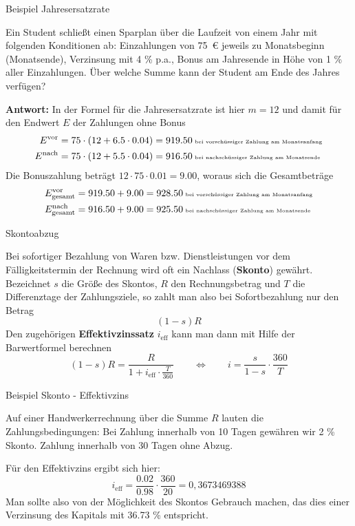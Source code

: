 \begin{frame}{Beispiel Jahresersatzrate}
	\begin{example}
	Ein Student schließt einen Sparplan über die Laufzeit von einem Jahr mit folgenden Konditionen ab: Einzahlungen von 75 € jeweils zu Monatsbeginn (Monatsende), Verzinsung mit 4 \% p.a., Bonus am Jahresende in Höhe von 1 \% aller Einzahlungen. Über welche Summe kann der Student am Ende des Jahres verfügen?
	
	\textbf{Antwort: } In der Formel für die Jahresersatzrate ist hier $m=12$ und damit für den Endwert $E$ der Zahlungen ohne Bonus
	\begin{align*}
		E^{\text{vor}} &  = 75 \cdot \left( 12+6.5 \cdot 0.04 \right) = 919.50 \text{\tiny{ bei vorschüssiger Zahlung am Monatsanfang}} \\
		E^{\text{nach}} &  = 75 \cdot \left( 12+5.5 \cdot 0.04 \right) = 916.50 \text{\tiny{ bei nachschüssiger Zahlung am Monatsende}}
	\end{align*}
	Die Bonuszahlung beträgt $12 \cdot 75 \cdot 0.01 = 9.00$, woraus sich die Gesamtbeträge
		\begin{align*}
		E^{\text{vor}}_{\text{gesamt}} & = 919.50 + 9.00 = 928.50 \text{\tiny{ bei vorschüssiger Zahlung am Monatsanfang}} \\
		E^{\text{nach}}_{\text{gesamt}} & = 916.50 + 9.00 = 925.50 \text{\tiny{ bei nachschüssiger Zahlung am Monatsende}}
		\end{align*}
\end{example}		
\end{frame}

\begin{frame}{Skontoabzug}
	\begin{bemerkung}
		Bei sofortiger Bezahlung von Waren bzw. Dienstleistungen vor dem Fälligkeitstermin der Rechnung wird oft ein Nachlass (\textbf{Skonto}) gewährt. Bezeichnet $s$ die Größe des Skontos, $R$ den Rechnungsbetrag und $T$ die Differenztage der Zahlungsziele, so zahlt man also bei Sofortbezahlung nur den Betrag
		\[
			\left(1-s\right) R
		\] 
		Den zugehörigen \textbf{Effektivzinssatz} $i_{\text{eff}}$ kann man dann mit Hilfe der Barwertformel berechnen
		\[
			\left(1-s\right) R = \frac{R}{1+i_{\text{eff}}\cdot\frac{T}{360}} \qquad \Leftrightarrow \qquad i = \frac{s}{1-s} \cdot \frac{360}{T}
		\]
	\end{bemerkung}
\end{frame}

\begin{frame}{Beispiel Skonto - Effektivzins}
	\begin{example}
		Auf einer Handwerkerrechnung über die Summe $R$ lauten die Zahlungsbedingungen:
		 \glqq Bei Zahlung innerhalb von 10 Tagen gewähren wir 2 \% Skonto. Zahlung innerhalb von 30 Tagen ohne Abzug. \grqq 
		 
		 Für den Effektivzins ergibt sich hier:
		 \[
			 i_{\text{eff}} = \frac{0.02}{0.98} \cdot \frac{360}{20} = 0,3673469388
		 \]
		 Man sollte also von der Möglichkeit des Skontos Gebrauch machen, das dies einer Verzinsung des Kapitals mit 36.73 \% entspricht.
	\end{example}
\end{frame}

